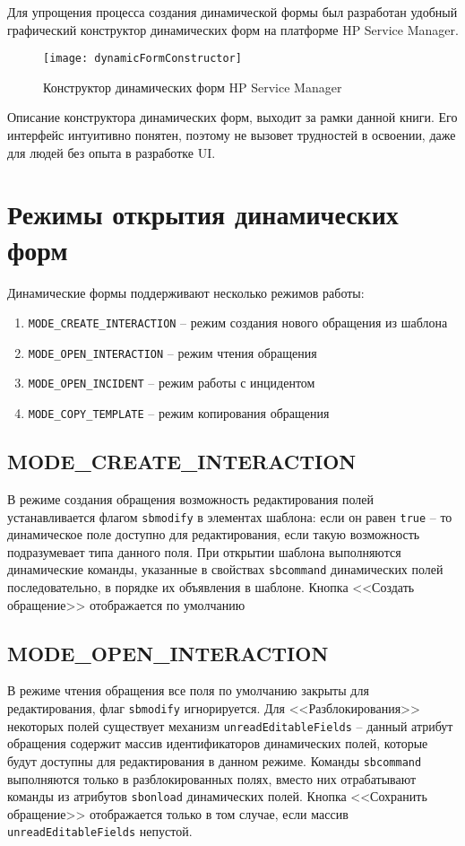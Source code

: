 \documentclass[../index.tex]{subfiles}
\begin{document}
Для упрощения процесса создания динамической формы был разработан удобный графический конструктор
динамических форм на платформе HP Service Manager.

\begin{figure}[h]
    \texttt{[image: dynamicFormConstructor]}
    \centering
    \caption{Конструктор динамических форм HP Service Manager}
\end{figure}

Описание конструктора динамических форм, выходит за рамки данной книги.
Его интерфейс интуитивно понятен, поэтому не вызовет трудностей в освоении,
даже для людей без опыта в разработке UI.

\section{Режимы открытия динамических форм}
Динамические формы поддерживают несколько режимов работы:

\begin{enumerate}
    \item \verb|MODE_CREATE_INTERACTION| -- режим создания нового обращения из шаблона
    \item \verb|MODE_OPEN_INTERACTION| -- режим чтения обращения
    \item \verb|MODE_OPEN_INCIDENT| -- режим работы с инцидентом
    \item \verb|MODE_COPY_TEMPLATE| -- режим копирования обращения
\end{enumerate}

\subsection{MODE\_CREATE\_INTERACTION}
В режиме создания обращения возможность редактирования полей устанавливается 
флагом \verb|sbmodify| в элементах шаблона: если он равен \verb|true| -- то динамическое поле доступно для редактирования, если такую возможность подразумевает типа данного поля.
При открытии шаблона выполняются динамические команды, указанные в свойствах  \verb|sbcommand| динамических
полей последовательно, в порядке их объявления в шаблоне. Кнопка <<Создать обращение>> отображается по умолчанию
    
\subsection{MODE\_OPEN\_INTERACTION}
В режиме чтения обращения все поля по умолчанию закрыты для редактирования, флаг \verb|sbmodify| игнорируется.
Для <<Разблокирования>> некоторых полей существует механизм \verb|unreadEditableFields| -- данный атрибут обращения содержит массив идентификаторов динамических полей, которые будут доступны для редактирования в данном режиме. Команды \verb|sbcommand| выполняются только в разблокированных полях, вместо них отрабатывают команды из атрибутов \verb|sbonload| динамических полей. Кнопка <<Сохранить обращение>> отображается только в том случае, если массив \verb|unreadEditableFields| непустой.
\end{document}
